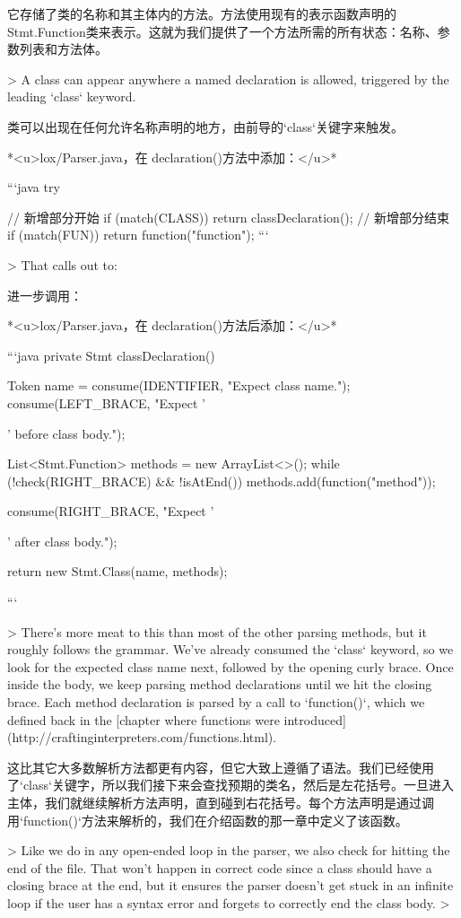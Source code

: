 \documentclass[cn,11pt,chinese]{elegantbook}
\begin{document}
{{{{{{{{{{{{{{{{{{它存储了类的名称和其主体内的方法。方法使用现有的表示函数声明的Stmt.Function类来表示。这就为我们提供了一个方法所需的所有状态：名称、参数列表和方法体。

> A class can appear anywhere a named declaration is allowed, triggered by the leading `class` keyword.

类可以出现在任何允许名称声明的地方，由前导的`class`关键字来触发。

*<u>lox/Parser.java，在 declaration()方法中添加：</u>*

```java
    try {  
      // 新增部分开始
      if (match(CLASS)) return classDeclaration();
      // 新增部分结束
      if (match(FUN)) return function("function");
```

> That calls out to:

进一步调用：

*<u>lox/Parser.java，在 declaration()方法后添加：</u>*

```java
  private Stmt classDeclaration() {
    Token name = consume(IDENTIFIER, "Expect class name.");
    consume(LEFT_BRACE, "Expect '{' before class body.");

    List<Stmt.Function> methods = new ArrayList<>();
    while (!check(RIGHT_BRACE) && !isAtEnd()) {
      methods.add(function("method"));
    }

    consume(RIGHT_BRACE, "Expect '}' after class body.");

    return new Stmt.Class(name, methods);
  }
```

> There’s more meat to this than most of the other parsing methods, but it roughly follows the grammar. We’ve already consumed the `class` keyword, so we look for the expected class name next, followed by the opening curly brace. Once inside the body, we keep parsing method declarations until we hit the closing brace. Each method declaration is parsed by a call to `function()`, which we defined back in the [chapter where functions were introduced](http://craftinginterpreters.com/functions.html).

这比其它大多数解析方法都更有内容，但它大致上遵循了语法。我们已经使用了`class`关键字，所以我们接下来会查找预期的类名，然后是左花括号。一旦进入主体，我们就继续解析方法声明，直到碰到右花括号。每个方法声明是通过调用`function()`方法来解析的，我们在介绍函数的那一章中定义了该函数。

> Like we do in any open-ended loop in the parser, we also check for hitting the end of the file. That won’t happen in correct code since a class should have a closing brace at the end, but it ensures the parser doesn’t get stuck in an infinite loop if the user has a syntax error and forgets to correctly end the class body.
>

}}}}}}}}}}}}}}}}}}}
\end{document}
